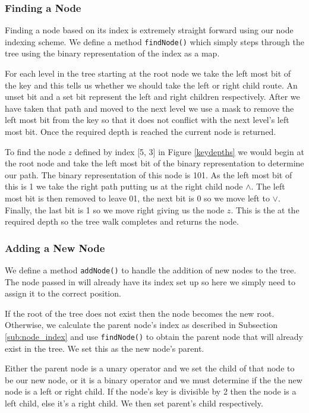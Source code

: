 \documentclass{report}
\begin{document}
\subsubsection{Finding a Node}

Finding a node based on its index is extremely straight forward using our node indexing scheme. We define a method {\tt findNode()} which simply steps through the tree using the binary representation of the index as a map.

For each level in the tree starting at the root node we take the left most bit of the key and this tells us whether we should take the left or right child route. An unset bit and a set bit represent the left and right children respectively. After we have taken that path and moved to the next level we use a mask to remove the left most bit from the key so that it does not conflict with the next level's left most bit. Once the required depth is reached the current node is returned.

To find the node $z$ defined by index [5, 3] in Figure \ref{keydepths} we would begin at the root node and take the left most bit of the binary representation to determine our path. The binary representation of this node is 101. As the left most bit of this is 1 we take the right path putting us at the right child node $\land$. The left most bit is then removed to leave 01, the next bit is 0 so we move left to $\lor$. Finally, the last bit is 1 so we move right giving us the node $z$. This is the at the required depth so the tree walk completes and returns the node. 

\subsubsection{Adding a New Node}

We define a method {\tt addNode()} to handle the addition of new nodes to the tree. The node passed in will already have its index set up so here we simply need to assign it to the correct position.

If the root of the tree does not exist then the node becomes the new root. Otherwise, we calculate the parent node's index as described in Subsection \ref{sub:node_index} and use {\tt findNode()} to obtain the parent node that will already exist in the tree. We set this as the new node's parent.

Either the parent node is a unary operator and we set the child of that node to be our new node, or it is a binary operator and we must determine if the the new node is a left or right child. If the node's key is divisible by 2 then the node is a left child, else it's a right child. We then set parent's child respectively. 
\end{document}
